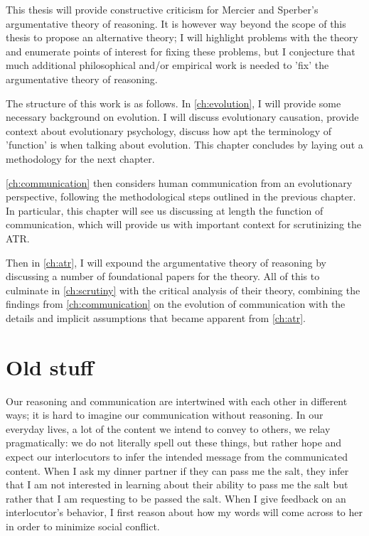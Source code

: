 This thesis will provide constructive criticism for Mercier and Sperber's argumentative theory of reasoning. It is however way beyond the scope of this thesis to propose an alternative theory; I will highlight problems with the theory and enumerate points of interest for fixing these problems, but I conjecture that much additional philosophical and/or empirical work is needed to 'fix' the argumentative theory of reasoning.

The structure of this work is as follows.
In \cref{ch:evolution}, I will provide some necessary background on evolution. I will discuss evolutionary causation, provide context about evolutionary psychology, discuss how apt the terminology of 'function' is when talking about evolution. This chapter concludes by laying out a methodology for the next chapter.

\cref{ch:communication} then considers human communication from an evolutionary perspective, following the methodological steps outlined in the previous chapter. In particular, this chapter will see us discussing at length the function of communication, which will provide us with important context for scrutinizing the ATR.

Then in \cref{ch:atr}, I will expound the argumentative theory of reasoning by discussing a number of foundational papers for the theory.
All of this to culminate in \cref{ch:scrutiny} with the critical analysis of their theory, combining the findings from \cref{ch:communication} on the evolution of communication with the details and implicit assumptions that became apparent from \cref{ch:atr}.

\section{Old stuff}

Our reasoning and communication are intertwined with each other in different ways; it is hard to imagine our communication without reasoning. In our everyday lives, a lot of the content we intend to convey to others, we relay pragmatically:
we do not literally spell out these things, but rather hope and expect our interlocutors to infer the intended message from the communicated content.
When I ask my dinner partner if they can pass me the salt, they infer that I am not interested in learning about their ability to pass me the salt but rather that I am requesting to be passed the salt.
When I give feedback on an interlocutor's behavior, I first reason about how my words will come across to her in order to minimize social conflict.

